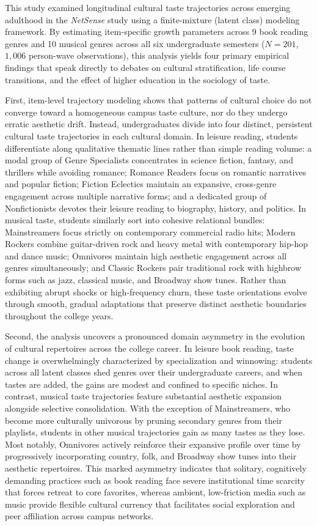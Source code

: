 \documentclass[12pt]{article}
\begin{document}
This study examined longitudinal cultural taste trajectories across emerging adulthood in the \textit{NetSense} study using a finite-mixture (latent class) modeling framework. By estimating item-specific growth parameters across 9 book reading genres and 10 musical genres across all six undergraduate semesters ($N = 201$, $1,006$ person-wave observations), this analysis yields four primary empirical findings that speak directly to debates on cultural stratification, life course transitions, and the effect of higher education in the sociology of taste.

First, item-level trajectory modeling shows that patterns of cultural choice do not converge toward a homogeneous campus taste culture, nor do they undergo erratic aesthetic drift. Instead, undergraduates divide into four distinct, persistent cultural taste trajectories in each cultural domain. In leisure reading, students differentiate along qualitative thematic lines rather than simple reading volume: a modal group of Genre Specialists concentrates in science fiction, fantasy, and thrillers while avoiding romance; Romance Readers focus on romantic narratives and popular fiction; Fiction Eclectics maintain an expansive, cross-genre engagement across multiple narrative forms; and a dedicated group of Nonfictionists devotes their leisure reading to biography, history, and politics. In musical taste, students similarly sort into cohesive relational bundles: Mainstreamers focus strictly on contemporary commercial radio hits; Modern Rockers combine guitar-driven rock and heavy metal with contemporary hip-hop and dance music; Omnivores maintain high aesthetic engagement across all genres simultaneously; and Classic Rockers pair traditional rock with highbrow forms such as jazz, classical music, and Broadway show tunes. Rather than exhibiting abrupt shocks or high-frequency churn, these taste orientations evolve through smooth, gradual adaptations that preserve distinct aesthetic boundaries throughout the college years.

Second, the analysis uncovers a pronounced domain asymmetry in the evolution of cultural repertoires across the college career. In leisure book reading, taste change is overwhelmingly characterized by specialization and winnowing: students across all latent classes shed genres over their undergraduate careers, and when tastes are added, the gains are modest and confined to specific niches. In contrast, musical taste trajectories feature substantial aesthetic expansion alongside selective consolidation. With the exception of Mainstreamers, who become more culturally univorous by pruning secondary genres from their playlists, students in other musical trajectories gain as many tastes as they lose. Most notably, Omnivores actively reinforce their expansive profile over time by progressively incorporating country, folk, and Broadway show tunes into their aesthetic repertoires. This marked asymmetry indicates that solitary, cognitively demanding practices such as book reading face severe institutional time scarcity that forces retreat to core favorites, whereas ambient, low-friction media such as music provide flexible cultural currency that facilitates social exploration and peer affiliation across campus networks.
\end{document}
